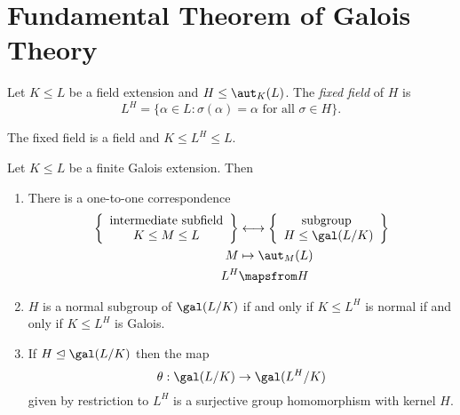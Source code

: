 \documentclass[a4paper]{article}
\begin{document}
\section{Fundamental Theorem of Galois Theory}

\begin{definition}
  Let \(K \leq L\) be a field extension and \(H \leq \aut_K(L)\). The \emph{fixed field} of \(H\) is
  \[
    L^H = \{\alpha \in L: \sigma(\alpha) = \alpha \text{ for all } \sigma \in H \}.
  \]
\end{definition}

The fixed field is a field and \(K \leq L^H \leq L\).

\begin{theorem}
  \label{thm:fundamental}
  Let \(K \leq L\) be a finite Galois extension. Then
  \begin{enumerate}
  \item There is a one-to-one correspondence
    \begin{align*}
      \left\{
        \begin{array}[h]{c}
          \text{intermediate subfield} \\
          K \leq M \leq L
        \end{array}
      \right\}
      &\longleftrightarrow
      \left\{
        \begin{array}[h]{c}
          \text{subgroup } \\
          H \leq \gal(L/K)
        \end{array}
      \right\} \\
      M &\mapsto \aut_M(L) \\
      L^H &\mapsfrom H
    \end{align*}
  \item \(H\) is a normal subgroup of \(\gal(L/K)\) if and only if \(K \leq L^H\) is normal if and only if \(K \leq L^H\) is Galois.
  \item If \(H \trianglelefteq \gal(L/K)\) then the map
    \[
      \theta: \gal(L/K) \to \gal(L^H/K)
    \]
    given by restriction to \(L^H\) is a surjective group homomorphism with kernel \(H\).
  \end{enumerate}
\end{theorem}
\end{document}
